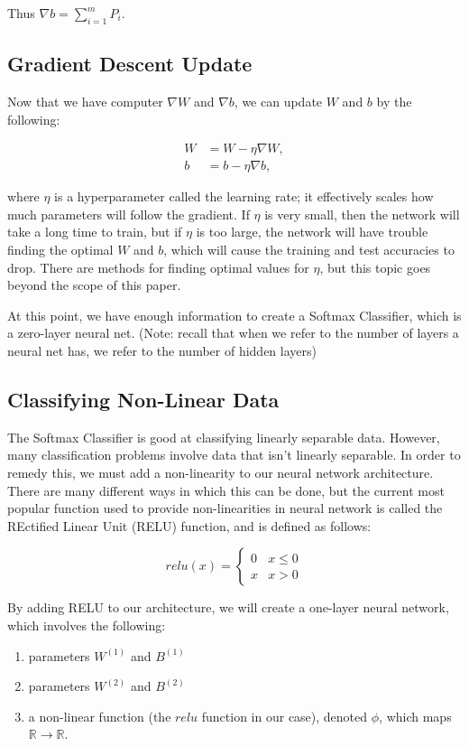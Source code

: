 Thus $\nabla b = \sum_{i=1}^m P_i$.

\subsection{Gradient Descent Update}
Now that we have computer $\nabla W$ and $\nabla b$, we can update $W$
and $b$ by the following:

\begin{align*}
W &= W - \eta \nabla W,\\
b &= b - \eta \nabla b, 
\end{align*}

where $\eta$ is a hyperparameter called the learning rate; it effectively
scales how much parameters will follow the gradient. If $\eta$ is very small,
then the network will take a long time to train, but if $\eta$ is too large,
the network will have trouble finding the optimal $W$ and $b$, which will cause
the training and test accuracies to drop. There are methods for finding optimal
values for $\eta$, but this topic goes beyond the scope of this paper.

At this point, we have enough information to create a Softmax Classifier, which is a
zero-layer neural net. (Note: recall that when we refer to the number of layers
a neural net has, we refer to the number of hidden layers)

\subsection{Classifying Non-Linear Data}
The Softmax Classifier is good at classifying linearly separable data. However,
many classification problems involve data that isn't linearly separable. In
order to remedy this, we must add a non-linearity to our neural network
architecture. There are many different ways in which this can be done, but the
current most popular function used to provide non-linearities in neural network
is called the REctified Linear Unit (RELU) function, and is defined as follows:

\[ relu(x) = \begin{cases} 
      0 & x\leq 0 \\
      x & x > 0 
   \end{cases}
\]

By adding RELU to our architecture, we will create a one-layer neural network,
which involves the following:
\begin{enumerate}
\item parameters $W^{(1)}$ and $B^{(1)}$
\item parameters $W^{(2)}$ and $B^{(2)}$ \item a non-linear function (the
$relu$ function in our case), denoted $\phi$, which maps $\mathbb{R}
\longrightarrow \mathbb{R}$.
\end{enumerate}

